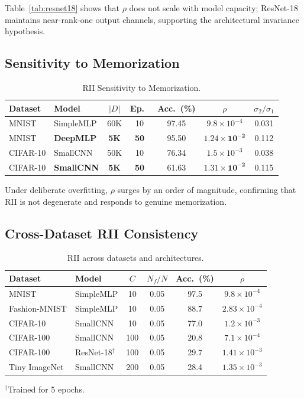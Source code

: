 \documentclass[journal]{IEEEtran}
\theoremstyle{definition}
\begin{document}
Table~\ref{tab:resnet18} shows that $\rho$ does not scale with model capacity; ResNet-18 maintains near-rank-one output channels, supporting the architectural invariance hypothesis.

\subsection{Sensitivity to Memorization}

\begin{table}[t]
\centering
\caption{RII Sensitivity to Memorization.}\label{tab:sensitivity}
\setlength{\tabcolsep}{3pt}
\begin{tabular}{l l c c c c c}
\toprule
Dataset & Model & $|D|$ & Ep.\ & Acc.\ (\%) & $\rho$ & $\sigma_2/\sigma_1$ \\
\midrule
MNIST   & SimpleMLP & 60K & 10  & 97.45 & $9.8{\times}10^{-4}$ & 0.031 \\
MNIST   & \textbf{DeepMLP} & \textbf{5K} & \textbf{50} & 95.50 & $\mathbf{1.24{\times}10^{-2}}$ & 0.112 \\
CIFAR-10 & SmallCNN & 50K & 10  & 76.34 & $1.5{\times}10^{-3}$ & 0.038 \\
CIFAR-10 & \textbf{SmallCNN} & \textbf{5K} & \textbf{50} & 61.63 & $\mathbf{1.31{\times}10^{-2}}$ & 0.115 \\
\bottomrule
\end{tabular}
\end{table}

Under deliberate overfitting, $\rho$ surges by an order of magnitude, confirming that RII is not degenerate and responds to genuine memorization.

\subsection{Cross-Dataset RII Consistency}

\begin{table}[t]
\centering
\caption{RII across datasets and architectures.}\label{tab:cross_dataset}
\setlength{\tabcolsep}{3pt}
\begin{tabular}{l l c c c c}
\toprule
Dataset & Model & $C$ & $N_f/N$ & Acc.\ (\%) & $\rho$ \\
\midrule
MNIST    & SimpleMLP & 10  & 0.05 & 97.5 & $9.8{\times}10^{-4}$ \\
Fashion-MNIST & SimpleMLP & 10 & 0.05 & 88.7 & $2.83{\times}10^{-4}$ \\
CIFAR-10 & SmallCNN  & 10  & 0.05 & 77.0 & $1.2{\times}10^{-3}$ \\
CIFAR-100& SmallCNN  & 100 & 0.05 & 20.8 & $7.1{\times}10^{-4}$ \\
CIFAR-100& ResNet-18$^\dagger$ & 100 & 0.05 & 29.7 & $1.41{\times}10^{-3}$ \\
Tiny ImageNet & SmallCNN & 200 & 0.05 & 28.4 & $1.35{\times}10^{-3}$ \\
\bottomrule
\end{tabular}
\footnotesize $^\dagger$Trained for 5 epochs.
\end{table}
\end{document}
